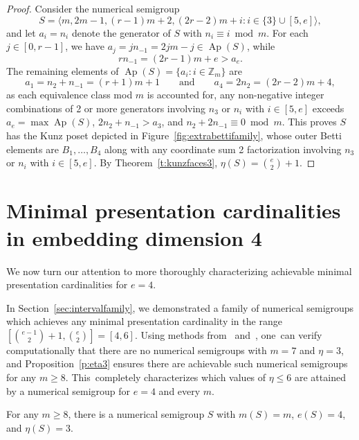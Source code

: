 \documentclass[ALCO]{cedram}
\newcommand\ZZ{\mathbb{Z}}
\DeclareMathOperator\Ap{Ap}
\begin{document}
\begin{proof}
Consider the numerical semigroup
$$
S = \langle m, 2m - 1, (r - 1)m + 2, (2r - 2)m + i : i \in \{3\} \cup [5, e]  \rangle,
$$
and let $a_i = n_i$ denote the generator of $S$ with $n_i \equiv i \bmod m$.  
For each $j \in [0, r - 1]$, we have $a_j = jn_{-1} = 2jm - j \in \Ap(S)$, while
$$
rn_{-1} = (2r - 1)m + e > a_e.
$$
The remaining elements of $\Ap(S) = \{a_i : i \in \ZZ_m\}$ are 
$$ 
a_1 = n_2 + n_{-1} = (r+1)m + 1
\qquad \text{and} \qquad
a_4 = 2n_2 = (2r - 2)m + 4,
$$
as each equivalence class mod $m$ is accounted for, any non-negative integer combinations of 2 or more generators involving $n_3$ or $n_i$ with $i \in [5,e]$ exceeds $a_e = \max \Ap(S)$, $2n_2 + n_{-1} > a_3$, and $n_2 + 2n_{-1} \equiv 0 \bmod m$.  This proves $S$ has the Kunz poset depicted in Figure~\ref{fig:extrabettifamily}, whose outer Betti elements are $B_1, \ldots, B_4$ along with any coordinate sum 2 factorization involving $n_3$ or $n_i$ with $i \in [5,e]$.  By Theorem~\ref{t:kunzfaces3}, $\eta(S) = \binom{e}{2} + 1$.  
\end{proof}







\section{Minimal presentation cardinalities in embedding dimension 4}
\label{sec:embdim4}


We now turn our attention to more thoroughly characterizing achievable minimal presentation cardinalities for $e = 4$. 

\begin{rema}\label{r:eta3}
In Section~\ref{sec:intervalfamily}, we demonstrated a family of numerical semigroups which achieves any minimal presentation cardinality in the range $[\binom{e-1}{2}+1, \binom{e}{2}] = [4, 6]$.  Using methods from~\cite{wilfmultiplicity} and~\cite{kunzfaces3}, one~can verify computationally that there are no numerical semigroups with $m = 7$ and $\eta = 3$, and Proposition~\ref{p:eta3} ensures there are achievable such numerical semigroups for any $m \ge 8$.  This~completely characterizes which values of $\eta \le 6$ are attained by a numerical semigroup for $e = 4$ and every $m$.  
\end{rema}

\begin{prop}\label{p:eta3}
For any $m \geq 8$, there is a numerical semigroup $S$ with $m(S) = m$, $e(S) = 4$, and $\eta(S) = 3$.
\end{prop}
\end{document}
